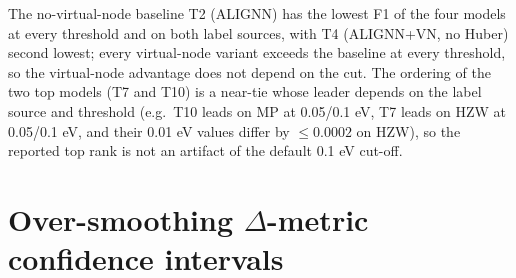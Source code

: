 \documentclass[a4paper,10pt]{article}
\begin{document}
The no-virtual-node baseline T2 (ALIGNN) has the lowest F1 of the four models at every threshold and on both label sources, with T4 (ALIGNN+VN, no Huber) second lowest; every virtual-node variant exceeds the baseline at every threshold, so the virtual-node advantage does not depend on the cut. The ordering of the two top models (T7 and T10) is a near-tie whose leader depends on the label source and threshold (e.g.\ T10 leads on MP at 0.05/0.1 eV, T7 leads on HZW at 0.05/0.1 eV, and their 0.01 eV values differ by \(\le 0.0002\) on HZW), so the reported top rank is not an artifact of the default 0.1 eV cut-off.

\section{Over-smoothing \texorpdfstring{\(\Delta\)}{delta}-metric confidence intervals}
\end{document}
